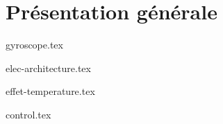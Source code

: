 \chapter{Présentation générale}%
\label{sec:presentation-generale}

{gyroscope.tex}

\newpage
{elec-architecture.tex}

\newpage
{effet-temperature.tex}

\newpage
{control.tex}


